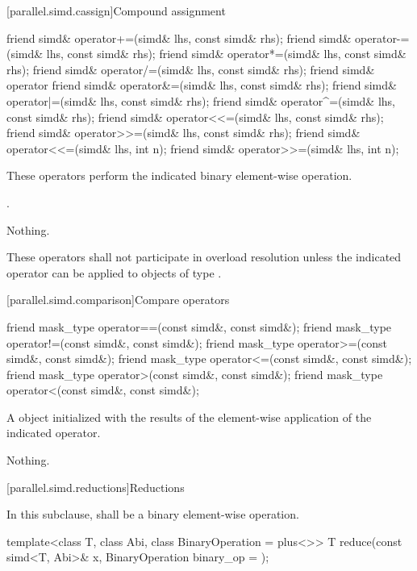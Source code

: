[parallel.simd.cassign]{Compound assignment}

\begin{itemdecl}
friend simd& operator+=(simd& lhs, const simd& rhs);
friend simd& operator-=(simd& lhs, const simd& rhs);
friend simd& operator*=(simd& lhs, const simd& rhs);
friend simd& operator/=(simd& lhs, const simd& rhs);
friend simd& operator%
friend simd& operator&=(simd& lhs, const simd& rhs);
friend simd& operator|=(simd& lhs, const simd& rhs);
friend simd& operator^=(simd& lhs, const simd& rhs);
friend simd& operator<<=(simd& lhs, const simd& rhs);
friend simd& operator>>=(simd& lhs, const simd& rhs);
friend simd& operator<<=(simd& lhs, int n);
friend simd& operator>>=(simd& lhs, int n);
\end{itemdecl}

\begin{itemdescr}
  \pnum\effects
  These operators perform the indicated binary element-wise operation.

  \pnum\returns
  .

  \pnum\throws Nothing.

  \pnum\remarks
  These operators shall not participate in overload resolution unless the indicated operator can be applied to objects of type .
\end{itemdescr}

[parallel.simd.comparison]{Compare operators}

\begin{itemdecl}
friend mask_type operator==(const simd&, const simd&);
friend mask_type operator!=(const simd&, const simd&);
friend mask_type operator>=(const simd&, const simd&);
friend mask_type operator<=(const simd&, const simd&);
friend mask_type operator>(const simd&, const simd&);
friend mask_type operator<(const simd&, const simd&);
\end{itemdecl}

\begin{itemdescr}
  \pnum\returns
  A  object initialized with the results of the element-wise application of the indicated operator.

  \pnum\throws Nothing.
\end{itemdescr}

[parallel.simd.reductions]{Reductions}

\pnum
In this subclause,  shall be a binary element-wise operation.

\begin{itemdecl}
template<class T, class Abi, class BinaryOperation = plus<>>
  T reduce(const simd<T, Abi>& x, BinaryOperation binary_op = {});
\end{itemdecl}

